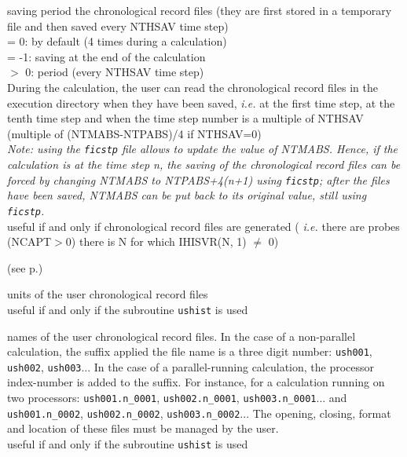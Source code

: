 {saving period the chronological record files (they are first stored in a
temporary file and then saved every NTHSAV time step)\\
\hspace*{1.3cm}= 0: by default (4 times during a calculation)\\
\hspace*{1.3cm}= -1: saving at the end of the calculation\\
\hspace*{1.3cm}$>$ 0: period (every NTHSAV time step)\\
During the calculation, the user can read the chronological record files
in the execution directory when they have been saved, {\em i.e.} at the first
time step, at the tenth time step and when the time step number is a multiple of
NTHSAV (multiple of (NTMABS-NTPABS)/4 if NTHSAV=0)\\
{\em Note: using the \texttt{ficstp} file allows to update the value of
NTMABS. Hence, if the calculation is at the time step n, the saving of the
chronological record files can be forced by changing NTMABS to NTPABS+4(n+1)
using \texttt{ficstp}; after the files have been saved, NTMABS can be put back
to its original value, still using \texttt{ficstp}.}\\
useful if and only if chronological record files are generated ({\em
i.e.} there are probes (NCAPT$>$0) there is N for which IHISVR(N, 1)
$\ne$ 0)}

(see p.\pageref{prg_ushist})

{units of the user chronological record files\\
useful if and only if the subroutine \texttt{ushist} is used}

{names of the user chronological record files.
In the case of a non-parallel calculation, the suffix applied the file
name is a three digit number: \texttt{ush001}, \texttt{ush002},
\texttt{ush003}...
In the case of a parallel-running calculation, the processor
index-number is added to the suffix. For instance, for a calculation
running on two processors:  \texttt{ush001.n\_0001},
\texttt{ush002.n\_0001}, \texttt{ush003.n\_0001}... and
\texttt{ush001.n\_0002},
\texttt{ush002.n\_0002}, \texttt{ush003.n\_0002}...
The opening, closing, format and location of these files must be managed
by the user.\\
useful if and only if the subroutine \texttt{ushist} is used}


